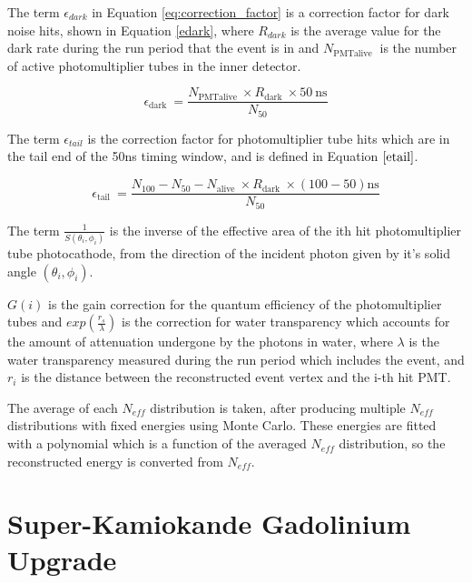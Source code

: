 The term $\epsilon_{dark}$ in Equation \ref{eq:correction_factor} is a correction factor for dark noise hits, shown in Equation \ref{edark}, where $R_{dark}$ is the average value for the dark rate during the run period that the event is in and $N_{\text {PMT}\text {alive }}$ is the number of active photomultiplier tubes in the inner detector.


\begin{equation}
    \epsilon_{\text {dark }}=\frac{N_{\text {PMT}\text {alive }} \times R_{\text {dark }} \times 50 \mathrm{~ns}}{N_{50}}
    \label{edark}
\end{equation}

The term $\epsilon_{tail}$ is the correction factor for photomultiplier tube hits which are in the tail end of the 50ns timing window, and is defined in Equation $\ref{etail}$.

\begin{equation}
    \epsilon_{\text {tail }}=\frac{N_{100}-N_{50}-N_{\text {alive }} \times R_{\text {dark }} \times(100-50) \mathrm{ns}}{N_{50}}
    \label{etail}
\end{equation}


The term $\frac{1}{S(\theta_{i}, \phi_{i})}$ is the inverse of the effective area of the ith hit photomultiplier tube photocathode, from the direction of the incident photon given by it's solid angle $(\theta_{i}, \phi_{i})$.

$G(i)$ is the gain correction for the quantum efficiency of the photomultiplier tubes and $exp(\frac{r_{s}}{\lambda})$ is the correction for water transparency which accounts for the amount of attenuation undergone by the photons in water, where $\lambda$ is the water transparency measured during the run period which includes the event, and $r_{i}$ is the distance between the reconstructed event vertex and the i-th hit PMT.

The average of each $N_{eff}$ distribution is taken, after producing multiple $N_{eff}$ distributions with fixed energies using Monte Carlo. These energies are fitted with a polynomial which is a function of the averaged $N_{eff}$ distribution, so the reconstructed energy is converted from $N_{eff}$.

\section{Super-Kamiokande Gadolinium Upgrade}

